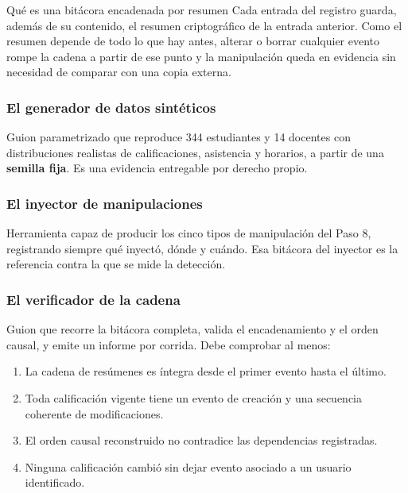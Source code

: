 \documentclass[11pt,a4paper]{article}
\begin{document}
	\begin{defBox}{Qué es una bitácora encadenada por resumen}
		Cada entrada del registro guarda, además de su contenido, el resumen criptográfico de la entrada anterior. Como el resumen depende de todo lo que hay antes, alterar o borrar cualquier evento rompe la cadena a partir de ese punto y la manipulación queda en evidencia sin necesidad de comparar con una copia externa.
	\end{defBox}
	
	\subsubsection{El generador de datos sintéticos}
	
	Guion parametrizado que reproduce 344 estudiantes y 14 docentes con distribuciones realistas de calificaciones, asistencia y horarios, a partir de una \textbf{semilla fija}. Es una evidencia entregable por derecho propio.
	
	\subsubsection{El inyector de manipulaciones}
	
	Herramienta capaz de producir los cinco tipos de manipulación del Paso 8, registrando siempre qué inyectó, dónde y cuándo. Esa bitácora del inyector es la referencia contra la que se mide la detección.
	
	\subsubsection{El verificador de la cadena}
	
	Guion que recorre la bitácora completa, valida el encadenamiento y el orden causal, y emite un informe por corrida. Debe comprobar al menos:
	
	\begin{enumerate}[leftmargin=*,itemsep=2pt]
		\item La cadena de resúmenes es íntegra desde el primer evento hasta el último.
		\item Toda calificación vigente tiene un evento de creación y una secuencia coherente de modificaciones.
		\item El orden causal reconstruido no contradice las dependencias registradas.
		\item Ninguna calificación cambió sin dejar evento asociado a un usuario identificado.
	\end{enumerate}
	
\end{document}
